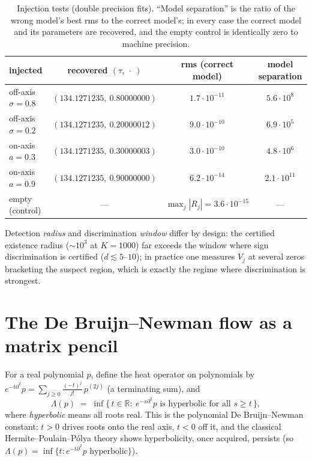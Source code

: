 \documentclass[11pt]{amsart}
\theoremstyle{remark}
\newcommand{\R}{\mathbb{R}}
\begin{document}
\begin{table}[ht]
\centering
\begin{tabular}{lccc}
\toprule
injected & recovered $(\tau,\ \cdot\ )$ & rms (correct model) & model separation\\
\midrule
off-axis $\sigma=0.8$ & $(134.1271235,\ 0.80000000)$ & $1.7\cdot 10^{-11}$ & $5.6\cdot 10^{8}$\\
off-axis $\sigma=0.2$ & $(134.1271235,\ 0.20000012)$ & $9.0\cdot 10^{-10}$ & $6.9\cdot 10^{5}$\\
on-axis $a=0.3$ & $(134.1271235,\ 0.30000003)$ & $3.0\cdot 10^{-10}$ & $4.8\cdot 10^{6}$\\
on-axis $a=0.9$ & $(134.1271235,\ 0.90000000)$ & $6.2\cdot 10^{-14}$ & $2.1\cdot 10^{11}$\\
empty (control) & --- & $\max_j|R_j|=3.6\cdot 10^{-15}$ & ---\\
\bottomrule
\end{tabular}
\medskip
\caption{Injection tests (double precision fits). ``Model separation'' is the ratio of the wrong model's best rms to the correct model's; in every case the correct model and its parameters are recovered, and the empty control is identically zero to machine precision.}
\label{tab:synthetic}
\end{table}

Detection \emph{radius} and discrimination \emph{window} differ by design: the certified existence radius ($\sim\!10^3$ at $K=1000$) far exceeds the window where sign discrimination is certified ($d\lesssim 5$--$10$); in practice one measures $V_j$ at several zeros bracketing the suspect region, which is exactly the regime where discrimination is strongest.

\section{The De Bruijn--Newman flow as a matrix pencil}\label{sec:pencil}

For a real polynomial $p$, define the heat operator on polynomials by $e^{-t\partial^2}p=\sum_{j\ge 0}\frac{(-t)^j}{j!}\,p^{(2j)}$ (a terminating sum), and
\[
\Lambda(p)\;=\;\inf\{\,t\in\R:\ e^{-s\partial^2}p \text{ is hyperbolic for all } s\ge t\,\},
\]
where \emph{hyperbolic} means all roots real. This is the polynomial De Bruijn--Newman constant: $t>0$ drives roots onto the real axis, $t<0$ off it, and the classical Hermite--Poulain--P\'olya theory \cite{Polya,deBruijn} shows hyperbolicity, once acquired, persists (so $\Lambda(p)=\inf\{t: e^{-t\partial^2}p \text{ hyperbolic}\}$).
\end{document}
